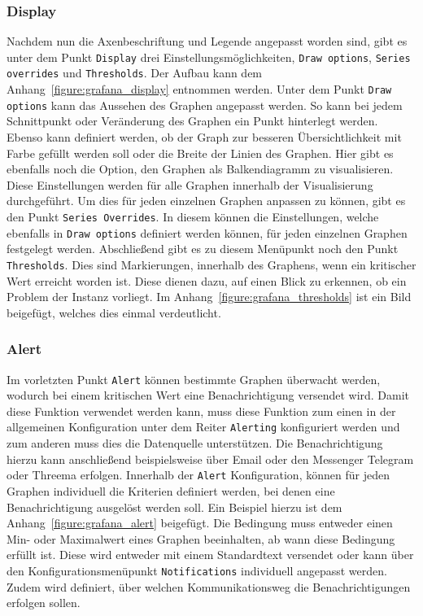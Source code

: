 \subsubsection{Display}
Nachdem nun die Axenbeschriftung und Legende angepasst worden sind, gibt es
unter dem Punkt \texttt{Display} drei Einstellungsmöglichkeiten, \texttt{Draw
options}, \texttt{Series overrides} und \texttt{Thresholds}. Der Aufbau kann
dem Anhang~\ref{figure:grafana_display} entnommen werden. Unter dem Punkt
\texttt{Draw options} kann das Aussehen des Graphen angepasst werden. So kann
bei jedem Schnittpunkt oder Veränderung des Graphen ein Punkt hinterlegt
werden. Ebenso kann definiert werden, ob der Graph zur besseren
Übersichtlichkeit mit Farbe gefüllt werden soll oder die Breite der Linien des
Graphen. Hier gibt es ebenfalls noch die Option, den Graphen als Balkendiagramm
zu visualisieren. Diese Einstellungen werden für alle Graphen innerhalb der
Visualisierung durchgeführt. Um dies für jeden einzelnen Graphen anpassen zu
können, gibt es den Punkt \texttt{Series Overrides}. In diesem können die
Einstellungen, welche ebenfalls in \texttt{Draw options} definiert werden
können, für jeden einzelnen Graphen festgelegt werden. Abschließend gibt es zu
diesem Menüpunkt noch den Punkt \texttt{Thresholds}. Dies sind Markierungen,
innerhalb des Graphens, wenn ein kritischer Wert erreicht worden ist. Diese
dienen dazu, auf einen Blick zu erkennen, ob ein Problem der Instanz vorliegt.
Im Anhang~\ref{figure:grafana_thresholds} ist ein Bild beigefügt, welches dies
einmal verdeutlicht.
\mr%

\subsubsection{Alert}
Im vorletzten Punkt \texttt{Alert} können bestimmte Graphen überwacht werden,
wodurch bei einem kritischen Wert eine Benachrichtigung versendet wird. Damit
diese Funktion verwendet werden kann, muss diese Funktion zum einen in der
allgemeinen Konfiguration unter dem Reiter \texttt{Alerting} konfiguriert
werden und zum anderen muss dies die Datenquelle unterstützen. Die
Benachrichtigung hierzu kann anschließend beispielsweise über Email oder den
Messenger Telegram oder Threema erfolgen. Innerhalb der \texttt{Alert}
Konfiguration, können für jeden Graphen individuell die Kriterien definiert
werden, bei denen eine Benachrichtigung ausgelöst werden soll. Ein Beispiel
hierzu ist dem Anhang~\ref{figure:grafana_alert} beigefügt. Die Bedingung muss
entweder einen Min\hyp{} oder Maximalwert eines Graphen beeinhalten, ab wann
diese Bedingung erfüllt ist. Diese wird entweder mit einem Standardtext
versendet oder kann über den Konfigurationsmenüpunkt \texttt{Notifications}
individuell angepasst werden. Zudem wird definiert, über welchen
Kommunikationsweg die Benachrichtigungen erfolgen sollen.
\mr%

